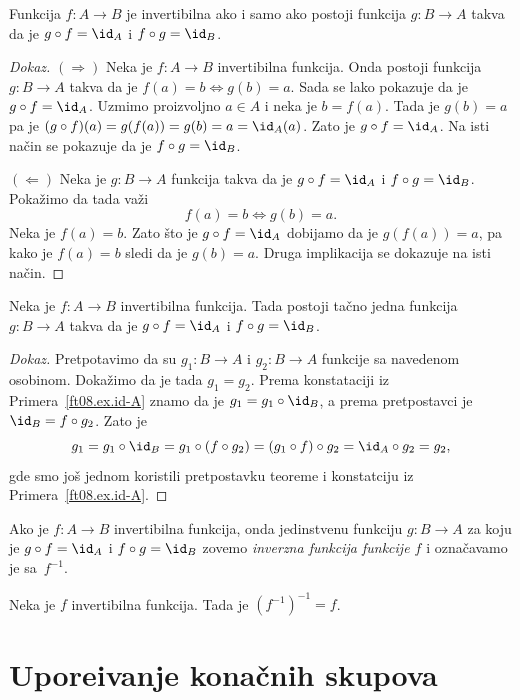 \begin{THM}
  Funkcija $f : A \to B$ je invertibilna ako i samo ako postoji funkcija $g : B \to A$ takva da je
  $g \circ f = \id_A$ i $f \circ g = \id_B$.
\end{THM}
\begin{proof}[Dokaz]
  $(\Rightarrow)$
  Neka je $f : A \to B$ invertibilna funkcija. Onda postoji funkcija $g : B \to A$ takva da
  je $f(a) = b \Leftrightarrow g(b) = a$. Sada se lako pokazuje da je $g \circ f = \id_A$. Uzmimo proizvoljno $a \in A$
  i neka je $b = f(a)$. Tada je $g(b) = a$ pa je $(g \circ f)(a) = g(f(a)) = g(b) = a = \id_A(a)$. Zato je $g \circ f = \id_A$.
  Na isti na\v cin se pokazuje da je $f \circ g = \id_B$.
  
  $(\Leftarrow)$
  Neka je $g : B \to A$ funkcija takva da je $g \circ f = \id_A$ i $f \circ g = \id_B$. Poka\v zimo da tada va\v zi
  $$
    f(a) = b \Leftrightarrow g(b) = a.
  $$
  Neka je $f(a) = b$. Zato \v sto je $g \circ f = \id_A$ dobijamo da je
  $g(f(a)) = a$, pa kako je $f(a) = b$ sledi da je $g(b) = a$. Druga implikacija se dokazuje na isti na\v cin.
\end{proof}

\begin{THM}
  Neka je $f : A \to B$ invertibilna funkcija. Tada postoji ta\v cno jedna funkcija $g : B \to A$ takva da je
  $g \circ f = \id_A$ i $f \circ g = \id_B$.
\end{THM}
\begin{proof}[Dokaz]
  Pretpotavimo da su $g_1 : B \to A$ i $g_2 : B \to A$ funkcije sa navedenom osobinom. Doka\v zimo da je tada $g_1 = g_2$.
  Prema konstataciji iz Primera~\ref{ft08.ex.id-A} znamo da je $g_1 = g_1 \circ \id_B$, a prema pretpostavci je
  $\id_B = f \circ g_2$. Zato je
  $$
    g_1 = g_1 \circ \id_B = g_1 \circ (f \circ g_2) = (g_1 \circ f) \circ g_2 = \id_A \circ g_2 = g_2,
  $$
  gde smo jo\v s jednom koristili pretpostavku teoreme i konstatciju iz Primera~\ref{ft08.ex.id-A}.
\end{proof}

Ako je $f : A \to B$ invertibilna funkcija, onda jedinstvenu funkciju $g : B \to A$ za koju je
$g \circ f = \id_A$ i $f \circ g = \id_B$ zovemo \emph{inverzna funkcija funkcije $f$} i ozna\v cavamo je sa~$f^{-1}$.

\begin{THM}
  Neka je $f$ invertibilna funkcija. Tada je $(f^{-1})^{-1} = f$.
\end{THM}


\section[UPORE\Dj IVANJE KONA\v CNIH SKUPOVA]{Upore\dj ivanje kona\v cnih skupova}

